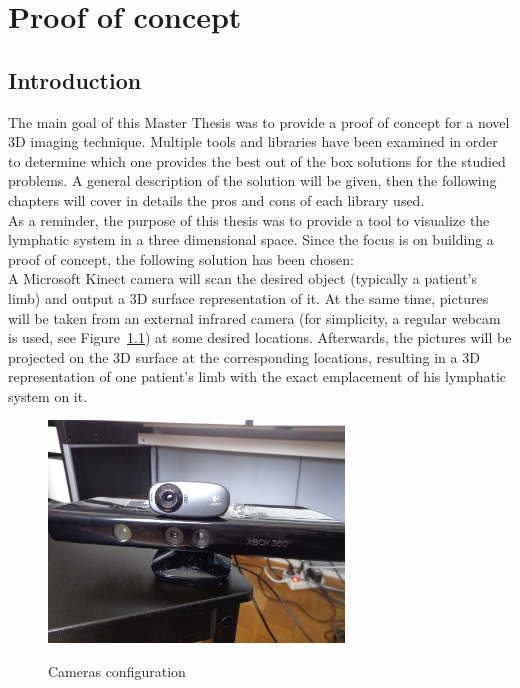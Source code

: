 \chapter[Proof of concept]{Proof of concept}
\section{Introduction}
\label{sec:proof of concept - introduction}
The main goal of this Master Thesis was to provide a proof of concept for a novel 3D imaging technique. Multiple tools and libraries have been examined in order to determine which one provides the best out of the box solutions for the studied problems. A general description of the solution will be given, then the following chapters will cover in details the pros and cons of each library used.
\\

As a reminder, the purpose of this thesis was to provide a tool to visualize the lymphatic system in a three dimensional space. Since the focus is on building a proof of concept, the following solution has been chosen:
\\

A Microsoft Kinect camera will scan the desired object (typically a patient's limb) and output a 3D surface representation of it. At the same time, pictures will be taken from an external infrared camera (for simplicity, a regular webcam is used, see Figure~\ref{fig:configuration}) at some desired locations. Afterwards, the pictures will be projected on the 3D surface at the corresponding locations, resulting in a 3D representation of one patient's limb with the exact emplacement of his lymphatic system on it.\\

\begin{figure}
\caption{Cameras configuration}
\centering
    \includegraphics[width=0.7\textwidth]{images/configuration.jpg}
\label{fig:configuration}
\end{figure}


